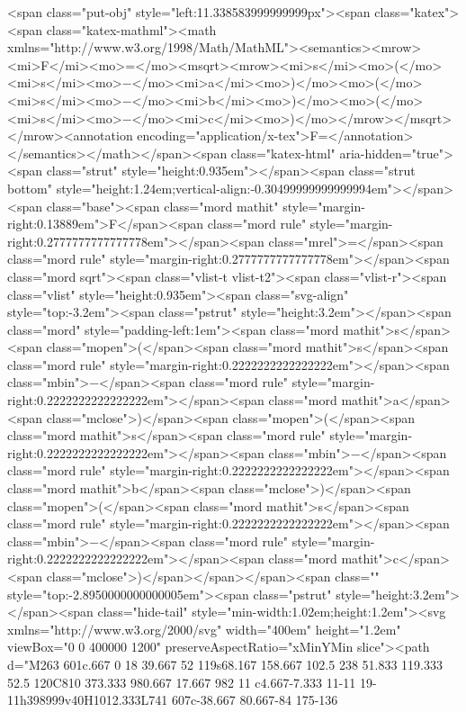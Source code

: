 <span class="put-obj" style="left:11.338583999999999px"><span class="katex"><span class="katex-mathml"><math xmlns="http://www.w3.org/1998/Math/MathML"><semantics><mrow><mi>F</mi><mo>=</mo><msqrt><mrow><mi>s</mi><mo>(</mo><mi>s</mi><mo>−</mo><mi>a</mi><mo>)</mo><mo>(</mo><mi>s</mi><mo>−</mo><mi>b</mi><mo>)</mo><mo>(</mo><mi>s</mi><mo>−</mo><mi>c</mi><mo>)</mo></mrow></msqrt></mrow><annotation encoding="application/x-tex">F=</annotation></semantics></math></span><span class="katex-html" aria-hidden="true"><span class="strut" style="height:0.935em"></span><span class="strut bottom" style="height:1.24em;vertical-align:-0.30499999999999994em"></span><span class="base"><span class="mord mathit" style="margin-right:0.13889em">F</span><span class="mord rule" style="margin-right:0.2777777777777778em"></span><span class="mrel">=</span><span class="mord rule" style="margin-right:0.2777777777777778em"></span><span class="mord sqrt"><span class="vlist-t vlist-t2"><span class="vlist-r"><span class="vlist" style="height:0.935em"><span class="svg-align" style="top:-3.2em"><span class="pstrut" style="height:3.2em"></span><span class="mord" style="padding-left:1em"><span class="mord mathit">s</span><span class="mopen">(</span><span class="mord mathit">s</span><span class="mord rule" style="margin-right:0.2222222222222222em"></span><span class="mbin">−</span><span class="mord rule" style="margin-right:0.2222222222222222em"></span><span class="mord mathit">a</span><span class="mclose">)</span><span class="mopen">(</span><span class="mord mathit">s</span><span class="mord rule" style="margin-right:0.2222222222222222em"></span><span class="mbin">−</span><span class="mord rule" style="margin-right:0.2222222222222222em"></span><span class="mord mathit">b</span><span class="mclose">)</span><span class="mopen">(</span><span class="mord mathit">s</span><span class="mord rule" style="margin-right:0.2222222222222222em"></span><span class="mbin">−</span><span class="mord rule" style="margin-right:0.2222222222222222em"></span><span class="mord mathit">c</span><span class="mclose">)</span></span></span><span class="" style="top:-2.8950000000000005em"><span class="pstrut" style="height:3.2em"></span><span class="hide-tail" style="min-width:1.02em;height:1.2em"><svg xmlns="http://www.w3.org/2000/svg" width="400em" height="1.2em" viewBox="0 0 400000 1200" preserveAspectRatio="xMinYMin slice"><path d="M263 601c.667 0 18 39.667 52 119s68.167
 158.667 102.5 238 51.833 119.333 52.5 120C810 373.333 980.667 17.667 982 11
c4.667-7.333 11-11 19-11h398999v40H1012.333L741 607c-38.667 80.667-84 175-136
